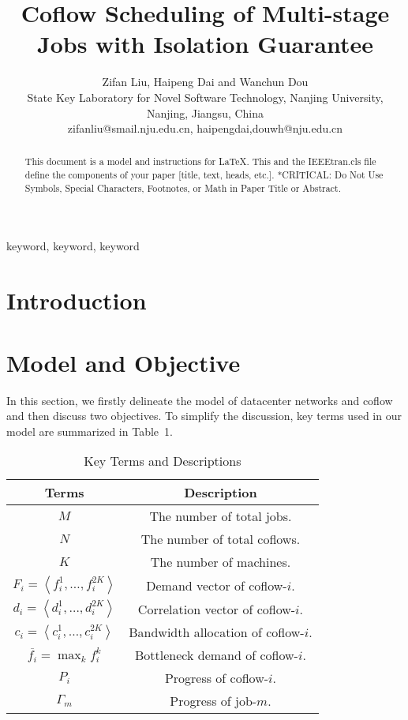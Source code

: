 \documentclass[10pt, conference, letterpaper]{IEEEtran}
\begin{document}
\title{Coflow Scheduling of Multi-stage Jobs with Isolation Guarantee}

\author{Zifan Liu, Haipeng Dai and Wanchun Dou\\
State Key Laboratory for Novel Software Technology, Nanjing University, Nanjing, Jiangsu, China\\
zifanliu@smail.nju.edu.cn, haipengdai,douwh@nju.edu.cn}

\maketitle

\begin{abstract}
This document is a model and instructions for \LaTeX.
This and the IEEEtran.cls file define the components of your paper [title, text, heads, etc.]. *CRITICAL: Do Not Use Symbols, Special Characters, Footnotes,
or Math in Paper Title or Abstract.
\end{abstract}

\begin{IEEEkeywords}
keyword, keyword, keyword
\end{IEEEkeywords}

\section{Introduction}


\section{Model and Objective}
In this section, we firstly delineate the model of datacenter networks and coflow and then discuss two objectives. To simplify the discussion, key terms used in our model are summarized in Table~1.
\begin{table}
\caption{Key Terms and Descriptions}
\begin{center}
\begin{tabular}{|c|c|}
\hline
Terms & Description\\
\hline
$M$ & The number of total jobs.\\
\hline
$N$ & The number of total coflows.\\
\hline
$K$ & The number of machines.\\
\hline
$F_i = \left\langle f_i^1,\dots,f_i^{2K}\right\rangle$ & Demand vector of coflow-$i$.\\
\hline
$d_i = \left\langle d_i^1,\dots,d_i^{2K}\right\rangle$ & Correlation vector of coflow-$i$.\\
\hline
$c_i=\left\langle c_i^1,\dots,c_i^{2K}\right\rangle$ & Bandwidth allocation of coflow-$i$.\\
\hline
$\overline{f_i}=\max_{k} f_i^k$ & Bottleneck demand of coflow-$i$.\\
\hline
$P_i$ & Progress of coflow-$i$.\\
\hline
$\Gamma_m$ & Progress of job-$m$.\\
\hline
\end{tabular}
\end{center}
\end{table}
\end{document}
